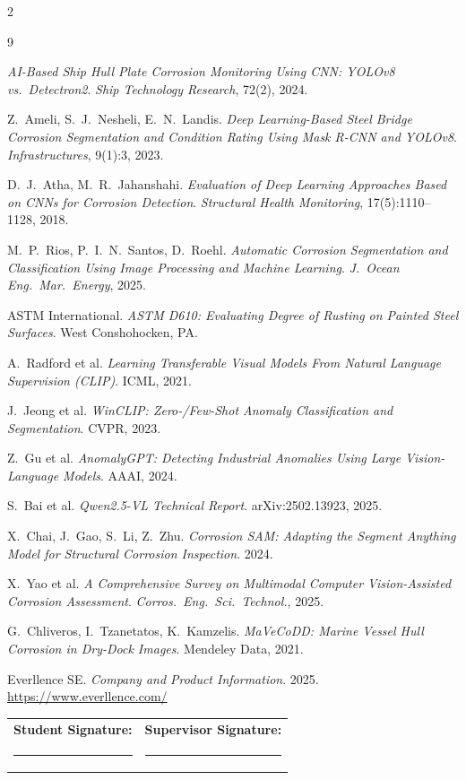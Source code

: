 \documentclass[10pt,a4paper]{article}
\begin{document}
{\scriptsize
\renewcommand{\refname}{}\vspace{-3.2em}
\begin{multicols}{2}
\raggedright
\begin{thebibliography}{9}\itemsep0pt

\textit{AI-Based Ship Hull Plate Corrosion Monitoring Using CNN: YOLOv8 vs.\ Detectron2}.
\textit{Ship Technology Research}, 72(2), 2024.

Z.\ Ameli, S.\ J.\ Nesheli, E.\ N.\ Landis.
\textit{Deep Learning-Based Steel Bridge Corrosion Segmentation and Condition Rating Using Mask R-CNN and YOLOv8}. \textit{Infrastructures}, 9(1):3, 2023.

D.\ J.\ Atha, M.\ R.\ Jahanshahi.
\textit{Evaluation of Deep Learning Approaches Based on CNNs for Corrosion Detection}. \textit{Structural Health Monitoring}, 17(5):1110--1128, 2018.

M.\ P.\ Rios, P.\ I.\ N.\ Santos, D.\ Roehl.
\textit{Automatic Corrosion Segmentation and Classification Using Image Processing and Machine Learning}. \textit{J.\ Ocean Eng.\ Mar.\ Energy}, 2025.

ASTM International. \textit{ASTM D610: Evaluating Degree of Rusting on Painted Steel Surfaces}. West Conshohocken, PA.

A.\ Radford et al.
\textit{Learning Transferable Visual Models From Natural Language Supervision (CLIP)}. ICML, 2021.

J.\ Jeong et al.
\textit{WinCLIP: Zero-/Few-Shot Anomaly Classification and Segmentation}. CVPR, 2023.

Z.\ Gu et al.
\textit{AnomalyGPT: Detecting Industrial Anomalies Using Large Vision-Language Models}. AAAI, 2024.

S.\ Bai et al.
\textit{Qwen2.5-VL Technical Report}. arXiv:2502.13923, 2025.

X.\ Chai, J.\ Gao, S.\ Li, Z.\ Zhu.
\textit{Corrosion SAM: Adapting the Segment Anything Model for Structural Corrosion Inspection}. 2024.

X.\ Yao et al.
\textit{A Comprehensive Survey on Multimodal Computer Vision-Assisted Corrosion Assessment}. \textit{Corros.\ Eng.\ Sci.\ Technol.}, 2025.

G.\ Chliveros, I.\ Tzanetatos, K.\ Kamzelis.
\textit{MaVeCoDD: Marine Vessel Hull Corrosion in Dry-Dock Images}. Mendeley Data, 2021.

Everllence SE. \textit{Company and Product Information}. 2025. \url{https://www.everllence.com/}

\end{thebibliography}
\end{multicols}}

\vspace{0.4em}
\noindent
{\small
\begin{tabularx}{\textwidth}{X X}
\textbf{Student Signature:} & \textbf{Supervisor Signature:} \\[1.4em]
\rule{0.42\textwidth}{0.4pt} & \rule{0.42\textwidth}{0.4pt} \\
\end{tabularx}}
\end{document}
